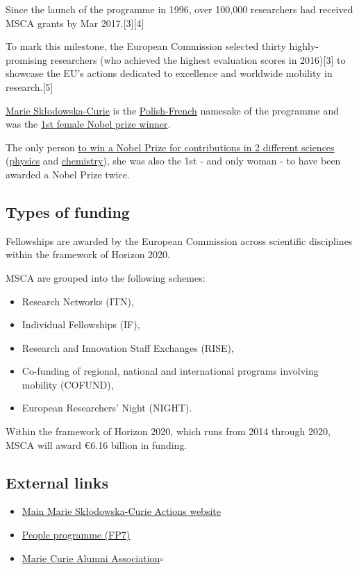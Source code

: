 \documentclass[oneside]{book}
\numberwithin{equation}{section}
\begin{document}
%
Since the launch of the programme in 1996, over 100,000 researchers had received MSCA grants by Mar 2017.[3][4]

To mark this milestone, the European Commission selected thirty highly-promising researchers (who achieved the highest evaluation scores in 2016)[3] to showcase the EU's actions dedicated to excellence and worldwide mobility in research.[5]

%
\href{https://en.wikipedia.org/wiki/Marie_Curie}{Marie Skłodowska-Curie} is the \href{https://en.wikipedia.org/wiki/Poles_in_France}{Polish-French} namesake of the programme and was the \href{https://en.wikipedia.org/wiki/List_of_female_Nobel_laureates}{1st female Nobel prize winner}.

The only person \href{https://en.wikipedia.org/wiki/Nobel_Prize#Multiple_laureates}{to win a Nobel Prize for contributions in 2 different sciences} (\href{https://en.wikipedia.org/wiki/Nobel_Prize_in_Physics}{physics} and \href{https://en.wikipedia.org/wiki/Nobel_Prize_in_Chemistry}{chemistry}), she was also the 1st - and only woman - to have been awarded a Nobel Prize twice.

\subsection{Types of funding}
Fellowships are awarded by the European Commission across scientific disciplines within the framework of Horizon 2020.

%
MSCA are grouped into the following schemes:
\begin{itemize}
    \item Research Networks (ITN),
    \item Individual Fellowships (IF),
    \item Research and Innovation Staff Exchanges (RISE),
    \item Co-funding of regional, national and international programs involving mobility (COFUND),
    \item European Researchers' Night (NIGHT).
\end{itemize}
Within the framework of Horizon 2020, which runs from 2014 through 2020, MSCA will award €6.16 billion in funding.

\subsection{External links}
\begin{itemize}
    \item \href{http://ec.europa.eu/research/mariecurieactions/}{Main Marie Sk\l odowska-Curie Actions website}
    \item \href{http://cordis.europa.eu/fp7/people/}{People programme (FP7)}
    \item \href{https://www.mariecuriealumni.eu/}{Marie Curie Alumni Association}\hfill$\square$
\end{itemize}
\end{document}
